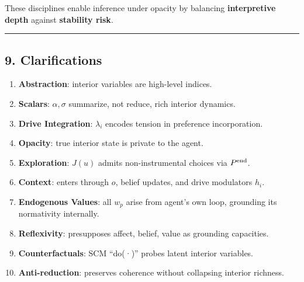 \documentclass[
]{article}
\providecommand{\tightlist}{%
  \setlength{\itemsep}{0pt}\setlength{\parskip}{0pt}}
\begin{document}
These disciplines enable inference under opacity by balancing
\textbf{interpretive depth} against \textbf{stability risk}.

\begin{center}\rule{0.5\linewidth}{0.5pt}\end{center}

\hypertarget{clarifications}{%
\subsection{9. Clarifications}\label{clarifications}}

\begin{enumerate}
\def\labelenumi{\arabic{enumi}.}
\tightlist
\item
  \textbf{Abstraction}: interior variables are high-level indices.\\
\item
  \textbf{Scalars}: \(\alpha,\sigma\) summarize, not reduce, rich
  interior dynamics.\\
\item
  \textbf{Drive Integration}: \(\lambda_i\) encodes tension in
  preference incorporation.\\
\item
  \textbf{Opacity}: true interior state is private to the agent.\\
\item
  \textbf{Exploration}: \(J(u)\) admits non-instrumental choices via
  \(P^{\rm end}\).\\
\item
  \textbf{Context}: enters through \(o\), belief updates, and drive
  modulators \(h_i\).\\
\item
  \textbf{Endogenous Values}: all \(w_p\) arise from agent's own loop,
  grounding its normativity internally.\\
\item
  \textbf{Reflexivity}: presupposes affect, belief, value as grounding
  capacities.\\
\item
  \textbf{Counterfactuals}: SCM ``do(·)'' probes latent interior
  variables.\\
\item
  \textbf{Anti-reduction}: preserves coherence without collapsing
  interior richness.
\end{enumerate}
\end{document}
